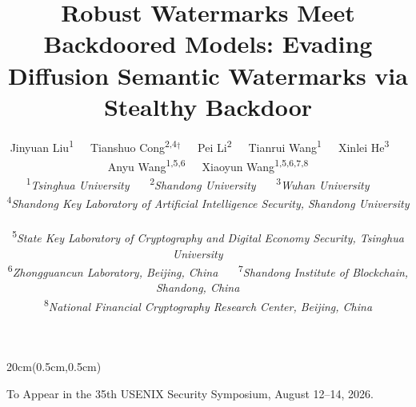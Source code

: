 \documentclass[letterpaper,twocolumn,10pt]{article}
\begin{document}
\begin{textblock*}{20cm}(0.5cm,0.5cm)
\begin{center}
To Appear in the 35th USENIX Security Symposium, August 12--14, 2026.
\end{center}
\end{textblock*}

\date{}

\title
{\Large \bf Robust Watermarks Meet Backdoored Models: Evading Diffusion Semantic Watermarks via Stealthy Backdoor}


\author{
{\rm Jinyuan Liu\textsuperscript{1}}\ \ \
{\rm Tianshuo Cong\textsuperscript{2,4}$^\dagger$}\ \ \
{\rm Pei Li\textsuperscript{2}}\ \ \
{\rm Tianrui Wang\textsuperscript{1}}\ \ \
{\rm Xinlei He\textsuperscript{3}}\ \ \ \\
{\rm Anyu Wang\textsuperscript{1,5,6}}\ \ \
{\rm Xiaoyun Wang\textsuperscript{1,5,6,7,8}}
\\
\textsuperscript{1}\textit{Tsinghua University} \ \ \ 
\textsuperscript{2}\textit{Shandong University} \ \ \
\textsuperscript{3}\textit{Wuhan University} \ \ \ \\
\textsuperscript{4}\textit{Shandong Key Laboratory of  Artificial Intelligence Security, Shandong University} \ \ \ \\
\textsuperscript{5}\textit{State Key Laboratory of Cryptography and Digital Economy Security, Tsinghua University} \ \ \ \\
\textsuperscript{6}\textit{Zhongguancun Laboratory, Beijing, China} \ \ \
\textsuperscript{7}\textit{Shandong Institute of Blockchain, Shandong, China} \ \ \ \\
\textsuperscript{8}\textit{National Financial Cryptography Research Center, Beijing, China} 
}


\maketitle
\pagestyle{empty}
\end{document}
